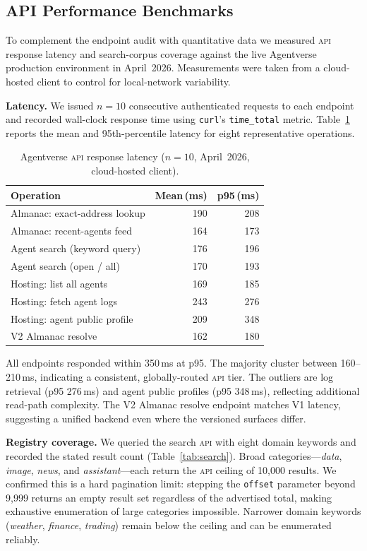 \documentclass[twoside,11pt]{article}
\begin{document}
\subsection{API Performance Benchmarks}
\label{subsec:benchmarks}

To complement the endpoint audit with quantitative data we measured
\textsc{api} response latency and search-corpus coverage against the
live Agentverse production environment in April~2026.  Measurements
were taken from a cloud-hosted client to control for local-network
variability.

\textbf{Latency.}  We issued $n{=}10$ consecutive authenticated
requests to each endpoint and recorded wall-clock response time using
\texttt{curl}'s \texttt{time\_total} metric.
Table~\ref{tab:latency} reports the mean and 95th-percentile latency
for eight representative operations.

\begin{table}[h]
\small\centering
\caption{Agentverse \textsc{api} response latency ($n{=}10$, April~2026,
  cloud-hosted client).}
\label{tab:latency}
\begin{tabular}{@{}lrr@{}}
\toprule
Operation & Mean\,(ms) & p95\,(ms) \\
\midrule
Almanac: exact-address lookup   & 190 & 208 \\
Almanac: recent-agents feed     & 164 & 173 \\
Agent search (keyword query)    & 176 & 196 \\
Agent search (open / all)       & 170 & 193 \\
Hosting: list all agents        & 169 & 185 \\
Hosting: fetch agent logs       & 243 & 276 \\
Hosting: agent public profile   & 209 & 348 \\
V2 Almanac resolve              & 162 & 180 \\
\bottomrule
\end{tabular}
\end{table}

All endpoints responded within 350\,ms at p95.  The majority cluster
between 160--210\,ms, indicating a consistent, globally-routed
\textsc{api} tier.  The outliers are log retrieval (p95 276\,ms) and
agent public profiles (p95 348\,ms), reflecting additional read-path
complexity.  The V2 Almanac resolve endpoint matches V1 latency,
suggesting a unified backend even where the versioned surfaces differ.

\textbf{Registry coverage.}  We queried the search \textsc{api} with
eight domain keywords and recorded the stated result count
(Table~\ref{tab:search}).  Broad categories---\emph{data},
\emph{image}, \emph{news}, and \emph{assistant}---each return the
\textsc{api} ceiling of 10{,}000 results.  We confirmed this is a
hard pagination limit: stepping the \texttt{offset} parameter beyond
9{,}999 returns an empty result set regardless of the advertised total,
making exhaustive enumeration of large categories impossible.  Narrower
domain keywords (\emph{weather}, \emph{finance}, \emph{trading})
remain below the ceiling and can be enumerated reliably.
\end{document}
